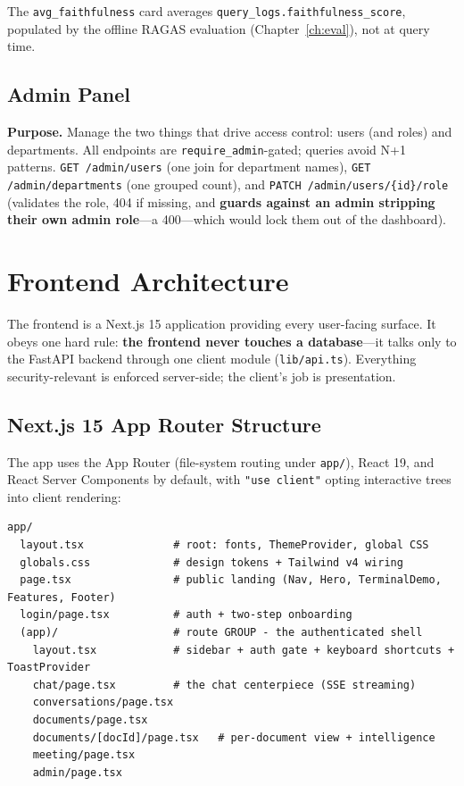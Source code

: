 \documentclass[11pt,a4paper,oneside]{report}
\newcommand{\code}[1]{\texttt{#1}}
\begin{document}
The \code{avg\_faithfulness} card averages \code{query\_logs.faithfulness\_score}, populated by the
offline RAGAS evaluation (Chapter~\ref{ch:eval}), not at query time.

\section{Admin Panel}
\textbf{Purpose.} Manage the two things that drive access control: users (and roles) and departments.
All endpoints are \code{require\_admin}-gated; queries avoid N+1 patterns. \code{GET /admin/users}
(one join for department names), \code{GET /admin/departments} (one grouped count), and
\code{PATCH /admin/users/\{id\}/role} (validates the role, 404 if missing, and \textbf{guards against
an admin stripping their own admin role}---a 400---which would lock them out of the dashboard).

\chapter{Frontend Architecture}
\label{ch:frontend}

The frontend is a Next.js 15 application providing every user-facing surface. It obeys one hard rule:
\textbf{the frontend never touches a database}---it talks only to the FastAPI backend through one
client module (\code{lib/api.ts}). Everything security-relevant is enforced server-side; the client's
job is presentation.

\section{Next.js 15 App Router Structure}
The app uses the App Router (file-system routing under \code{app/}), React 19, and React Server
Components by default, with \code{"use client"} opting interactive trees into client rendering:

\begin{lstlisting}[language=none,caption={The route tree.}]
app/
  layout.tsx              # root: fonts, ThemeProvider, global CSS
  globals.css             # design tokens + Tailwind v4 wiring
  page.tsx                # public landing (Nav, Hero, TerminalDemo, Features, Footer)
  login/page.tsx          # auth + two-step onboarding
  (app)/                  # route GROUP - the authenticated shell
    layout.tsx            # sidebar + auth gate + keyboard shortcuts + ToastProvider
    chat/page.tsx         # the chat centerpiece (SSE streaming)
    conversations/page.tsx
    documents/page.tsx
    documents/[docId]/page.tsx   # per-document view + intelligence
    meeting/page.tsx
    admin/page.tsx
\end{lstlisting}
\end{document}
